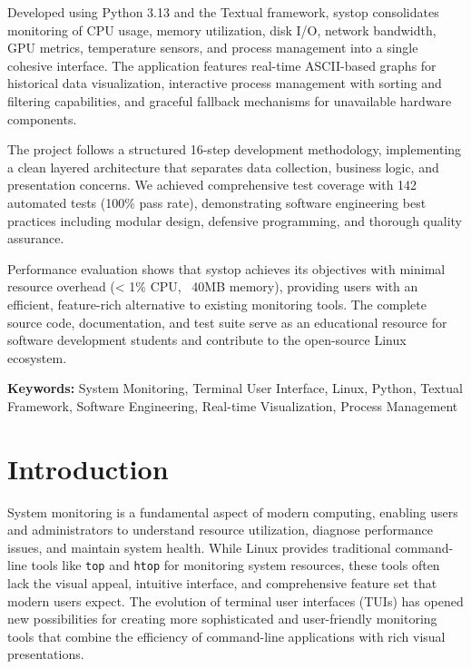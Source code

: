 \documentclass[12pt,a4paper,oneside]{report}
\begin{document}
Developed using Python 3.13 and the Textual framework, systop consolidates monitoring of CPU usage, memory utilization, disk I/O, network bandwidth, GPU metrics, temperature sensors, and process management into a single cohesive interface. The application features real-time ASCII-based graphs for historical data visualization, interactive process management with sorting and filtering capabilities, and graceful fallback mechanisms for unavailable hardware components.

The project follows a structured 16-step development methodology, implementing a clean layered architecture that separates data collection, business logic, and presentation concerns. We achieved comprehensive test coverage with 142 automated tests (100\% pass rate), demonstrating software engineering best practices including modular design, defensive programming, and thorough quality assurance.

Performance evaluation shows that systop achieves its objectives with minimal resource overhead (< 1\% CPU, ~40MB memory), providing users with an efficient, feature-rich alternative to existing monitoring tools. The complete source code, documentation, and test suite serve as an educational resource for software development students and contribute to the open-source Linux ecosystem.

\vspace{0.5cm}
\noindent\textbf{Keywords:} System Monitoring, Terminal User Interface, Linux, Python, Textual Framework, Software Engineering, Real-time Visualization, Process Management

\newpage
{}
\listoffigures

\newpage
{}
\listoftables

\newpage

\chapter{Introduction}
\label{chap:introduction}

System monitoring is a fundamental aspect of modern computing, enabling users and administrators to understand resource utilization, diagnose performance issues, and maintain system health. While Linux provides traditional command-line tools like \texttt{top} and \texttt{htop} for monitoring system resources, these tools often lack the visual appeal, intuitive interface, and comprehensive feature set that modern users expect. The evolution of terminal user interfaces (TUIs) has opened new possibilities for creating more sophisticated and user-friendly monitoring tools that combine the efficiency of command-line applications with rich visual presentations.
\end{document}
